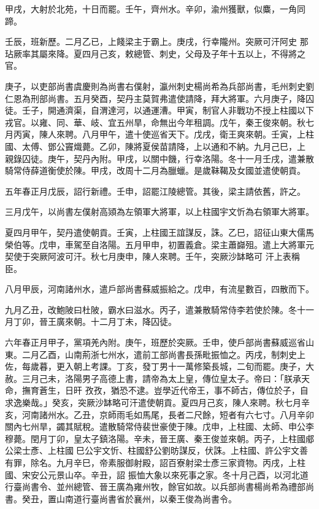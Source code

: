 \begin{pinyinscope}
 甲戌，大射於北苑，十日而罷。壬午，齊州水。辛卯，渝州獲獸，似麋，一角同蹄。



 壬辰，班新歷。二月乙已，上餞梁主于霸上。庚戌，行幸隴州。突厥可汗阿史
 那玷厥率其屬來降。夏四月己亥，敕總管、刺史，父母及子年十五以上，不得將之官。



 庚子，以吏部尚書虞慶則為尚書右僕射，瀛州刺史楊尚希為兵部尚書，毛州刺史劉仁恩為刑部尚書。五月癸酉，契丹主莫賀弗遣使請降，拜大將軍。六月庚子，降囚徒。壬子，開通濟渠，自渭達河，以通運漕。甲寅，制官人非戰功不授上柱國以下戎官。以雍、同、華、岐、宜五州旱，命無出今年租調。戊午，秦王俊來朝。秋七月丙寅，陳人來聘。八月甲午，遣十使巡省天下。戊戌，衛王爽來朝。壬寅，上柱國、太傅、鄧公竇熾薨。乙卯，陳將夏侯苗請降，上以通和不納。九月己巳，上
 親錄囚徒。庚午，契丹內附。甲戌，以關中饑，行幸洛陽。冬十一月壬戌，遣兼散騎常侍薛道衡使於陳。甲戌，改周十二月為臘蠟。是歲靺鞨及女國並遣使朝貢。



 五年春正月戊辰，詔行新禮。壬申，詔罷江陵總管。其後，梁主請依舊，許之。



 三月戊午，以尚書左僕射高熲為左領軍大將軍，以上柱國宇文忻為右領軍大將軍。



 夏四月甲午，契丹遣使朝貢。壬寅，上柱國王誼謀反，誅。乙巳，詔征山東大儒馬榮伯等。戊申，車駕至自洛陽。五月甲申，初置義倉。梁主蕭巋殂。遣上大將軍元契使于突厥阿波可汗。秋七月庚申，陳人來聘。壬午，突厥沙缽略可
 汗上表稱臣。



 八月甲辰，河南諸州水，遣戶部尚書蘇威振給之。戊申，有流星數百，四散而下。



 九月乙丑，改鮑陂曰杜陂，霸水曰滋水。丙子，遣兼散騎常侍李若使於陳。冬十一月丁卯，晉王廣來朝。十二月丁未，降囚徒。



 六年春正月甲子，黨項羌內附。庚午，班歷於突厥。壬申，使戶部尚書蘇威巡省山東。二月乙酉，山南荊浙七州水，遣前工部尚書長孫毗振恤之。丙戌，制刺史上佐，每歲暮，更入朝上考課。丁亥，發丁男十一萬修築長城，二旬而罷。庚子，大赦。三月己未，洛陽男子高德上書，請帝為太上皇，傳位皇太子。帝曰：「朕承天命，撫育蒼生，日旰
 孜孜，猶恐不逮。豈學近代帝王，事不師古，傳位於子，自求逸樂哉。」癸亥，突厥沙缽略可汗遣使朝貢。夏四月己亥，陳人來聘。秋七月辛亥，河南諸州水。乙丑，京師雨毛如馬尾，長者二尺餘，短者有六七寸。八月辛卯關內七州旱，蠲其賦稅。遣散騎常侍裴世豪使于陳。戊申，上柱國、太師、申公李穆薨。閏月丁卯，皇太子鎮洛陽。辛未，晉王廣、秦王俊並來朝。丙子，上柱國郕公梁士彥、上柱國巳公宇文忻、柱國舒公劉昉謀反，伏誅。上柱國、許公宇文善有罪，除名。九月辛巳，帝素服御射殿，詔百寮射梁士彥三家資物。丙戌，上柱國、宋安公元景山卒。辛丑，詔
 振恤大象以來死事之家。冬十月己酉，以河北道行臺尚書令、並州總管、晉王廣為雍州牧，餘官如故。以兵部尚書楊尚希為禮部尚書。癸丑，置山南道行臺尚書省於襄州，以秦王俊為尚書令。




\end{pinyinscope}
